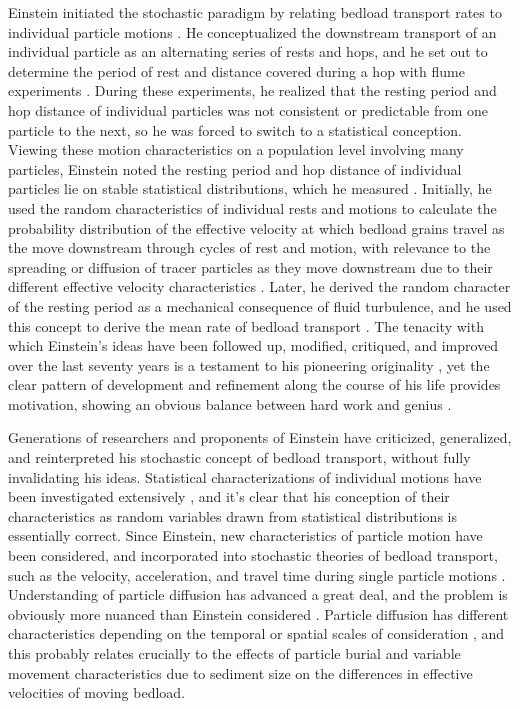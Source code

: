 \documentclass{article}
\begin{document}
Einstein initiated the stochastic paradigm by relating bedload transport rates to individual particle motions \citep{Einstein1942, Einstein1950}.
He conceptualized the downstream transport of an individual particle as an alternating series of rests and hops, and he set out to determine the period of rest and distance covered during a hop with flume experiments \citep{Einstein1937}. 
During these experiments, he realized that the resting period and hop distance of individual particles was not consistent or predictable from one particle to the next, so he was forced to switch to a statistical conception. 
Viewing these motion characteristics on a population level involving many particles, Einstein noted the resting period and hop distance of individual particles lie on stable statistical distributions, which he measured \citep{Einstein1937}. 
Initially, he used the random characteristics of individual rests and motions to calculate the probability distribution of the effective velocity at which bedload grains travel as the move downstream through cycles of rest and motion, with relevance to the spreading or diffusion of tracer particles as they move downstream due to their different effective velocity characteristics \citep{Einstein1937}. 
Later, he derived the random character of the resting period as a mechanical consequence of fluid turbulence, and he used this concept to derive the mean rate of bedload transport \citep{Einstein1950}. 
The tenacity with which Einstein's ideas have been followed up, modified, critiqued, and improved over the last seventy years is a testament to his pioneering originality \citep{Ettema2004}, yet the clear pattern of development and refinement along the course of his life provides motivation, showing an obvious balance between hard work and genius \citep{Einstein1937, Einstein1942, Einstein1950, Einstein1964}. 

Generations of researchers and proponents of Einstein have criticized, generalized, and reinterpreted his stochastic concept of bedload transport, without fully invalidating his ideas. 
Statistical characterizations of individual motions have been investigated extensively \citep{Hubbell1964, Yano1969, Nakagawa1976, Hassan1991, Habersack2001, Ancey2008, Roseberry2012, Heyman2016}, and it's clear that his conception of their characteristics as random variables drawn from statistical distributions is essentially correct. 
Since Einstein, new characteristics of particle motion have been considered, and incorporated into stochastic theories of bedload transport, such as the velocity, acceleration, and travel time during single particle motions \citep{Drake1988, Ancey2008, Lajeunesse2010, Roseberry2012, Fathel2015, Heyman2016}. 
Understanding of particle diffusion has advanced a great deal, and the problem is obviously more nuanced than Einstein considered \citep{Einstein1937}.  
Particle diffusion has different characteristics depending on the temporal or spatial scales of consideration \citep{Nikora2002, Zhang2012, Martin2012}, and this probably relates crucially to the effects of particle burial \citep{Sayre1971, Nakagawa1980, Voepel2013, Martin2014, Bradley2017} and variable movement characteristics due to sediment size \citep{Fan2017} on the differences in effective velocities of moving bedload. 
\end{document}

